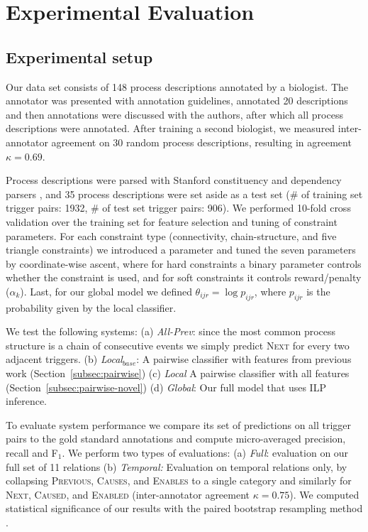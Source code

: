\section{Experimental Evaluation}

\subsection{Experimental setup} \label{subsec:setup}

Our data set consists of 148 process descriptions annotated by a biologist. The annotator was presented with annotation guidelines, annotated 20 descriptions and then annotations were discussed with the authors, after which all process descriptions were annotated. After training a second biologist, we measured inter-annotator agreement on 30 random process descriptions, resulting in agreement $\kappa=0.69$. 

Process descriptions were parsed with Stanford constituency and dependency parsers \cite{Klein03,Marneffe06}, and 35 process descriptions were set aside as a test set (\# of training set trigger pairs: 1932, \# of test set trigger pairs: 906). We performed 10-fold cross validation over the training set for feature selection and tuning of constraint parameters. For each constraint type (connectivity, chain-structure, and five triangle constraints) we introduced a parameter and tuned the seven parameters by coordinate-wise ascent, where for hard constraints a binary parameter controls whether the constraint is used, and for soft constraints it controls reward/penalty ($\alpha_k$). Last, for our global model we defined $\theta_{ijr}=\log p_{ijr}$, where $p_{ijr}$ is the probability given by the local classifier.

We test the following systems: (a) \emph{All-Prev}: since the most common process structure is a chain of consecutive events we simply predict \textsc{Next} for every two adjacent triggers. (b) \emph{Local$_{base}$}: A pairwise classifier with features from previous work (Section~\ref{subsec:pairwise}) (c) \emph{Local} A pairwise classifier with all features (Section~\ref{subsec:pairwise-novel}) (d) \emph{Global}: Our full model that uses ILP inference.


To evaluate system performance we compare its set of predictions on all trigger pairs to the gold standard annotations and compute micro-averaged precision, recall and F$_1$. We perform two types of evaluations: (a) \emph{Full}: evaluation on our full set of 11 relations (b) \emph{Temporal:} Evaluation on temporal relations only, by collapsing \textsc{Previous}, \textsc{Causes}, and \textsc{Enables} to a single category and similarly for \textsc{Next}, \textsc{Caused}, and \textsc{Enabled} (inter-annotator agreement $\kappa=0.75$). We computed statistical significance of our results with the paired bootstrap resampling method \cite{efron1993}.


